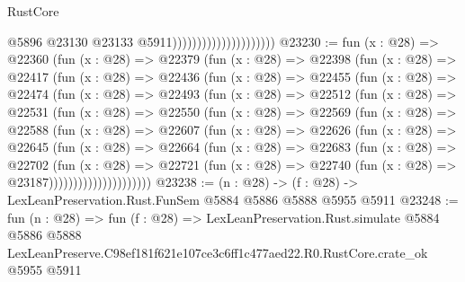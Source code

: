 \begin{lexlean}{RustCore}
\begin{coremodule}
                                              @5896
                                              @23130
                                              @23133
                                              @5911)))))))))))))))))))))
@23230 := fun (x : @28) =>
  @22360
    (fun (x : @28) =>
    @22379
      (fun (x : @28) =>
      @22398
        (fun (x : @28) =>
        @22417
          (fun (x : @28) =>
          @22436
            (fun (x : @28) =>
            @22455
              (fun (x : @28) =>
              @22474
                (fun (x : @28) =>
                @22493
                  (fun (x : @28) =>
                  @22512
                    (fun (x : @28) =>
                    @22531
                      (fun (x : @28) =>
                      @22550
                        (fun (x : @28) =>
                        @22569
                          (fun (x : @28) =>
                          @22588
                            (fun (x : @28) =>
                            @22607
                              (fun (x : @28) =>
                              @22626
                                (fun (x : @28) =>
                                @22645
                                  (fun (x : @28) =>
                                  @22664
                                    (fun (x : @28) =>
                                    @22683
                                      (fun (x : @28) =>
                                      @22702
                                        (fun (x : @28) =>
                                        @22721
                                          (fun (x : @28) =>
                                          @22740 (fun (x : @28) => @23187)))))))))))))))))))))
@23238 := (n : @28) -> (f : @28) -> LexLeanPreservation.Rust.FunSem @5884 @5886 @5888 @5955 @5911
@23248 := fun (n : @28) =>
  fun (f : @28) =>
  LexLeanPreservation.Rust.simulate
    @5884
    @5886
    @5888
    LexLeanPreserve.C98ef181f621e107ce3c6ff1c477aed22.R0.RustCore.crate_ok
    @5955
    @5911
\end{coremodule}
\end{lexlean}
